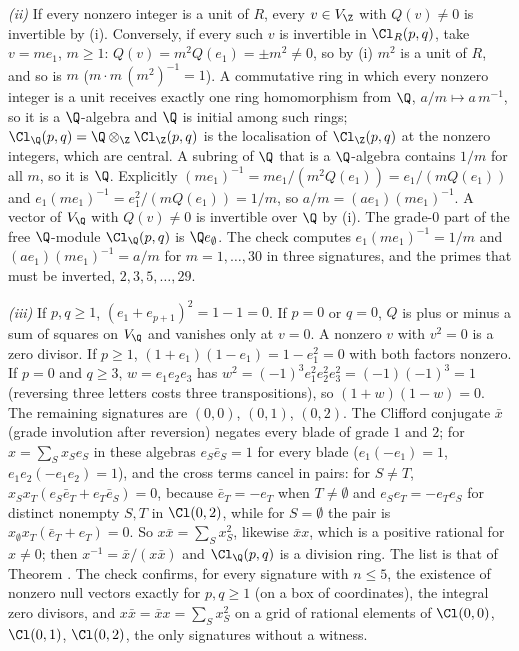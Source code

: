 \emph{(ii)} If every nonzero integer is a unit of $R$, every $v \in V_{\Z}$ with $Q(v) \ne 0$ is invertible by (i). Conversely, if every such $v$ is invertible in $\Cl_{R}(p,q)$, take $v = me_{1}$, $m \ge 1$: $Q(v) = m^{2}Q(e_{1}) = \pm m^{2} \ne 0$, so by (i) $m^{2}$ is a unit of $R$, and so is $m$ ($m \cdot m\,(m^{2})^{-1} = 1$). A commutative ring in which every nonzero integer is a unit receives exactly one ring homomorphism from $\Q$, $a/m \mapsto a\,m^{-1}$, so it is a $\Q$-algebra and $\Q$ is initial among such rings; $\Cl_{\Q}(p,q) = \Q \otimes_{\Z} \Cl_{\Z}(p,q)$ is the localisation of $\Cl_{\Z}(p,q)$ at the nonzero integers, which are central. A subring of $\Q$ that is a $\Q$-algebra contains $1/m$ for all $m$, so it is $\Q$. Explicitly $(me_{1})^{-1} = me_{1}/(m^{2}Q(e_{1})) = e_{1}/(mQ(e_{1}))$ and $e_{1}(me_{1})^{-1} = e_{1}^{2}/(mQ(e_{1})) = 1/m$, so $a/m = (ae_{1})(me_{1})^{-1}$. A vector of $V_{\Q}$ with $Q(v) \ne 0$ is invertible over $\Q$ by (i). The grade-$0$ part of the free $\Q$-module $\Cl_{\Q}(p,q)$ is $\Q e_{\emptyset}$. The check computes $e_{1}(me_{1})^{-1} = 1/m$ and $(ae_{1})(me_{1})^{-1} = a/m$ for $m = 1, \dots, 30$ in three signatures, and the primes that must be inverted, $2, 3, 5, \dots, 29$.

\emph{(iii)} If $p, q \ge 1$, $(e_{1} + e_{p+1})^{2} = 1 - 1 = 0$. If $p = 0$ or $q = 0$, $Q$ is plus or minus a sum of squares on $V_{\Q}$ and vanishes only at $v = 0$. A nonzero $v$ with $v^{2} = 0$ is a zero divisor. If $p \ge 1$, $(1 + e_{1})(1 - e_{1}) = 1 - e_{1}^{2} = 0$ with both factors nonzero. If $p = 0$ and $q \ge 3$, $w = e_{1}e_{2}e_{3}$ has $w^{2} = (-1)^{3}e_{1}^{2}e_{2}^{2}e_{3}^{2} = (-1)(-1)^{3} = 1$ (reversing three letters costs three transpositions), so $(1 + w)(1 - w) = 0$. The remaining signatures are $(0,0)$, $(0,1)$, $(0,2)$. The Clifford conjugate $\bar{x}$ (grade involution after reversion) negates every blade of grade $1$ and $2$; for $x = \sum_{S}x_{S}e_{S}$ in these algebras $e_{S}\bar{e}_{S} = 1$ for every blade ($e_{1}(-e_{1}) = 1$, $e_{1}e_{2}(-e_{1}e_{2}) = 1$), and the cross terms cancel in pairs: for $S \ne T$, $x_{S}x_{T}(e_{S}\bar{e}_{T} + e_{T}\bar{e}_{S}) = 0$, because $\bar{e}_{T} = -e_{T}$ when $T \ne \emptyset$ and $e_{S}e_{T} = -e_{T}e_{S}$ for distinct nonempty $S, T$ in $\Cl(0,2)$, while for $S = \emptyset$ the pair is $x_{\emptyset}x_{T}(\bar{e}_{T} + e_{T}) = 0$. So $x\bar{x} = \sum_{S}x_{S}^{2}$, likewise $\bar{x}x$, which is a positive rational for $x \ne 0$; then $x^{-1} = \bar{x}/(x\bar{x})$ and $\Cl_{\Q}(p,q)$ is a division ring. The list is that of Theorem . The check confirms, for every signature with $n \le 5$, the existence of nonzero null vectors exactly for $p, q \ge 1$ (on a box of coordinates), the integral zero divisors, and $x\bar{x} = \bar{x}x = \sum_{S}x_{S}^{2}$ on a grid of rational elements of $\Cl(0,0)$, $\Cl(0,1)$, $\Cl(0,2)$, the only signatures without a witness.

